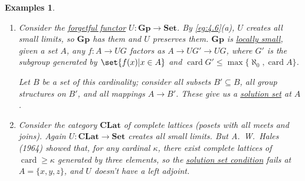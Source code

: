 \documentclass{article}
\newtheorem{nexample}[nthm]{Examples}
\begin{document}
\begin{nexample}\label{eg:4.13}\leavevmode
  \begin{enumerate}[label=(\alph*)]
    \item Consider the \hyperlink{def:forgFunc}{forgetful functor} $U: \mathbf{Gp} \to \mathbf{Set}$.
      By \cref{eg:4.6}(a), $U$ creates all small limits, so $\mathbf{Gp}$ has them and $U$ preserves them.
      $\mathbf{Gp}$ is \hyperlink{def:lsmall}{locally small}, given a set $A$, any $f: A \to UG$ factors as $A \to UG' \to UG$, where $G'$ is the subgroup generated by $\set{f(x) | x \in A}$ and $\operatorname{card} G' \leq \max\{\aleph_0, \operatorname{card} A\}$.

      Let $B$ be a set of this cardinality; consider all subsets $B' \subseteq B$, all group structures on $B'$, and all mappings $A \to B'$.
      These give us a \hyperlink{def:ssc}{solution set} at $A$.
    \item Consider the category $\mathbf{CLat}$ of complete lattices (posets with all meets and joins).
      Again $U: \mathbf{CLat} \to \mathbf{Set}$ creates all small limits.
      But A.\ W.\ Hales (1964) showed that, for any cardinal $\kappa$, there exist complete lattices of $\operatorname{card} \geq\kappa$ generated by three elements, so the \hyperlink{def:ssc}{solution set condition} fails at $A = \{x,y,z\}$, and $U$ doesn't have a left adjoint.
  \end{enumerate}
\end{nexample}
\end{document}
